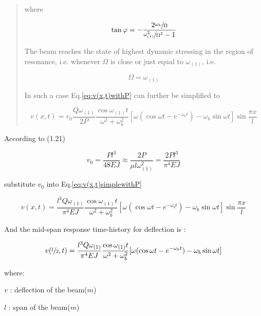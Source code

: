 \begin{quote}
where

\begin{equation}
    \tan \varphi = -\frac{2\sfrac{\omega_b}{\Omega}}{\sfrac{\omega_{(1)}^2}{\Omega^2}-1}
\end{equation}

The beam reaches the state of highest dynamic stressing in the region of resonance, i.e. whenever $\Omega$ is close or just equal to $\omega_{(1)}$, i.e.

\begin{equation}
    \Omega = \omega_{(1)}
\end{equation}

In such a case Eq.\ref{eq:v(x,t)withP} can further be simplified to 

\begin{equation}\label{eq:v(x,t)simplewithP}
    v(x,t) = v_0 \frac{Q\omega_{(1)}}{2P}\frac{\cos \omega_{(1)}t}{\omega^2+\omega_b^2}[\omega(\cos\omega t - e^{-\omega_b t})-\omega_b\sin\omega t]\sin\frac{\pi x}{l}
\end{equation}

\end{quote}

According to (1.21)

\begin{equation}
    v_0 = \frac{Pl^3}{48EJ} \approx \frac{2P}{\mu l \omega_{(1)}^2} = \frac{2Pl^3}{\pi ^4 EJ}
\end{equation}

substitute $v_0$ into Eq.\ref{eq:v(x,t)simplewithP}

\begin{equation}\label{eq:v(x,t)simpleharmonic}
    v(x,t) = \frac{l^3Q\omega_{(1)}}{\pi^4 EJ}\frac{\cos \omega_{(1)}t}{\omega^2+\omega_b^2}[\omega(\cos\omega t - e^{-\omega_b t})-\omega_b\sin\omega t]\sin\frac{\pi x}{l}
\end{equation}

And the mid-span response time-history for deflection is :

\begin{equation}\label{eq:v(x,t)simpleharmonic}
    v(\sfrac{l}{2},t) = \frac{l^3Q\omega_{(1)}}{\pi^4 EJ}\frac{\cos \omega_{(1)}t}{\omega^2+\omega_b^2}[\omega(\cos\omega t - e^{-\omega_b t})-\omega_b\sin\omega t]
\end{equation}

where:

$v$ : deflection of the beam($m$)

$l$ : span of the beam($m$)

